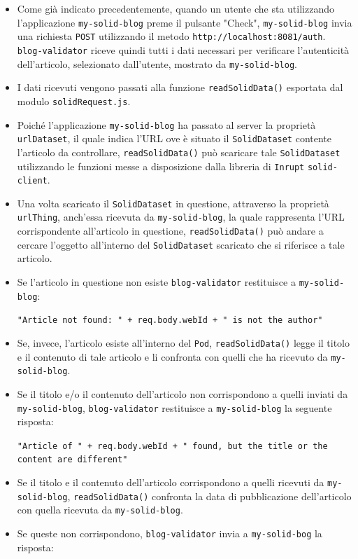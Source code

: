 \begin{itemize}
	\item Come già indicato precedentemente, quando un utente che sta utilizzando l'applicazione {\tt my-solid-blog} preme il pulsante "Check", {\tt my-solid-blog} invia una richiesta {\tt POST} utilizzando il metodo {\tt http://localhost:8081/auth}. {\tt blog-validator} riceve quindi tutti i dati necessari per verificare l'autenticità dell'articolo, selezionato dall'utente, mostrato da {\tt my-solid-blog}.
	\item I dati ricevuti vengono passati alla funzione {\tt readSolidData()} esportata dal modulo {\tt solidRequest.js}.
	\item Poiché l'applicazione {\tt my-solid-blog} ha passato al server la proprietà {\tt urlDataset}, il quale indica l'URL ove è situato il {\tt SolidDataset} contente l'articolo da controllare, {\tt readSolidData()} può scaricare tale {\tt SolidDataset} utilizzando le funzioni messe a disposizione dalla libreria di {\tt Inrupt} {\tt solid-client}. 
	\item Una volta scaricato il {\tt SolidDataset} in questione, attraverso la proprietà {\tt urlThing}, anch'essa ricevuta da {\tt my-solid-blog}, la quale rappresenta l'URL corrispondente all'articolo in questione, {\tt readSolidData()} può andare a cercare l'oggetto all'interno del {\tt SolidDataset} scaricato che si riferisce a tale articolo.
	\item Se l'articolo in questione non esiste {\tt blog-validator} restituisce a {\tt my-solid-blog}:
	
	\smallskip
	
	{\tt "Article not found: " + req.body.webId + " is not the author"}
	\item Se, invece, l'articolo esiste all'interno del {\tt Pod}, {\tt readSolidData()} legge il titolo e il contenuto di tale articolo e li confronta con quelli che ha ricevuto da {\tt my-solid-blog}.
	\item Se il titolo e/o il contenuto dell'articolo non corrispondono a quelli inviati da {\tt my-solid-blog}, {\tt blog-validator} restituisce a {\tt my-solid-blog} la seguente risposta:
	
	\smallskip
	
	{\tt "Article of " + req.body.webId + " found, but the title or the content are different"}
	\item Se il titolo e il contenuto dell'articolo corrispondono a quelli ricevuti da {\tt my-solid-blog}, {\tt readSolidData()} confronta la data di pubblicazione dell'articolo con quella ricevuta da {\tt my-solid-blog}.
	\item Se queste non corrispondono, {\tt blog-validator} invia a {\tt my-solid-bog} la risposta:
	

\end{itemize}
